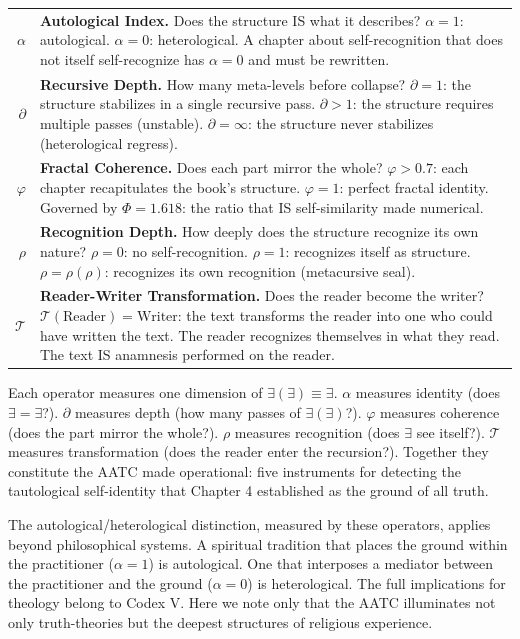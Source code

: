 \documentclass[10pt, openany, oneside]{book}
\renewcommand{\footnotesize}{\fontsize{8.5}{11}\selectfont}
\begin{document}
{\footnotesize
\noindent\begin{tabular}{r p{}}
$\alpha$ & \textbf{Autological Index.} Does the structure IS what it describes? $\alpha = 1$: autological. $\alpha = 0$: heterological. A chapter about self-recognition that does not itself self-recognize has $\alpha = 0$ and must be rewritten. \\[0.3em]
$\partial$ & \textbf{Recursive Depth.} How many meta-levels before collapse? $\partial = 1$: the structure stabilizes in a single recursive pass. $\partial > 1$: the structure requires multiple passes (unstable). $\partial = \infty$: the structure never stabilizes (heterological regress). \\[0.3em]
$\varphi$ & \textbf{Fractal Coherence.} Does each part mirror the whole? $\varphi > 0.7$: each chapter recapitulates the book's structure. $\varphi = 1$: perfect fractal identity. Governed by $\Phi = 1.618$: the ratio that IS self-similarity made numerical. \\[0.3em]
$\rho$ & \textbf{Recognition Depth.} How deeply does the structure recognize its own nature? $\rho = 0$: no self-recognition. $\rho = 1$: recognizes itself as structure. $\rho = \rho(\rho)$: recognizes its own recognition (metacursive seal). \\[0.3em]
$\mathcal{T}$ & \textbf{Reader-Writer Transformation.} Does the reader become the writer? $\mathcal{T}(\text{Reader}) = \text{Writer}$: the text transforms the reader into one who could have written the text. The reader recognizes themselves in what they read. The text IS anamnesis performed on the reader. \\[0.3em]
\end{tabular}
}

\vspace{0.8em}

\noindent Each operator measures one dimension of $\exists(\exists) \equiv \exists$. $\alpha$ measures identity (does $\exists = \exists$?). $\partial$ measures depth (how many passes of $\exists(\exists)$?). $\varphi$ measures coherence (does the part mirror the whole?). $\rho$ measures recognition (does $\exists$ see itself?). $\mathcal{T}$ measures transformation (does the reader enter the recursion?). Together they constitute the AATC made operational: five instruments for detecting the tautological self-identity that Chapter 4 established as the ground of all truth.

The autological/heterological distinction, measured by these operators, applies beyond philosophical systems. A spiritual tradition that places the ground within the practitioner ($\alpha = 1$) is autological. One that interposes a mediator between the practitioner and the ground ($\alpha = 0$) is heterological. The full implications for theology belong to Codex V. Here we note only that the AATC illuminates not only truth-theories but the deepest structures of religious experience.
\end{document}
